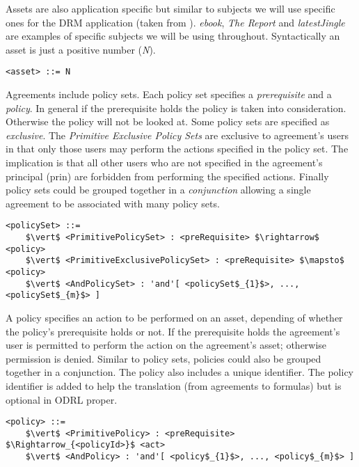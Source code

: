 Assets are also application specific but similar to subjects we will use specific ones for the DRM application (taken from \cite{pucella2006}). \emph{ebook}, \emph{The Report} and \emph{latestJingle} are examples of specific subjects we will be using throughout. Syntactically an asset is just a positive number (\emph{N}).

\lstset{mathescape, language=AST}  
\begin{lstlisting}[frame=single, caption={asset},label={lst:assetast}]
<asset> ::= N
\end{lstlisting}

Agreements include policy sets. Each policy set specifies a \emph{prerequisite} and a \emph{policy}. In general if the prerequisite holds the policy is taken into consideration. Otherwise the policy will not be looked at. Some policy sets are specified as \emph{exclusive}. The \emph{Primitive Exclusive Policy Sets} are exclusive to agreement's users in that only those users may perform the actions specified in the policy set. The implication is that all other users who are not specified in the agreement's principal (prin) are forbidden from performing the specified actions. Finally policy sets could be grouped together in a \emph{conjunction} allowing a single agreement to be associated with many policy sets. 



\lstset{mathescape, language=AST}  
\begin{lstlisting}[frame=single, caption={policySet},label={lst:policySetast}]
<policySet> ::=  
	$\vert$ <PrimitivePolicySet> : <preRequisite> $\rightarrow$ <policy> 
	$\vert$ <PrimitiveExclusivePolicySet> : <preRequisite> $\mapsto$ <policy>	 
	$\vert$ <AndPolicySet> : 'and'[ <policySet$_{1}$>, ..., <policySet$_{m}$> ]
\end{lstlisting}

A policy specifies an action to be performed on an asset, depending of whether the policy's prerequisite holds or not. If the prerequisite holds the agreement's user is permitted to perform the action on the agreement's asset; otherwise permission is denied. Similar to policy sets, policies could also be grouped together in a conjunction. The policy also includes a unique identifier. The policy identifier is added to help the translation (from agreements to formulas) but is optional in ODRL proper.


\lstset{mathescape, language=AST}  
\begin{lstlisting}[frame=single, caption={policy},label={lst:policyast}]
<policy> ::=  
	$\vert$ <PrimitivePolicy> : <preRequisite> $\Rightarrow_{<policyId>}$ <act>
	$\vert$ <AndPolicy> : 'and'[ <policy$_{1}$>, ..., <policy$_{m}$> ]
\end{lstlisting}

